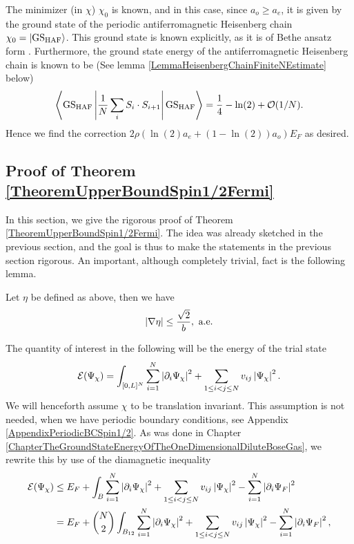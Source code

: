 The minimizer (in $ \chi $) $ \chi_0 $ is known, and in this case, since $ a_o\geq a_e $, it is given by the ground state of the periodic antiferromagnetic Heisenberg chain $ \chi_0=\ket{\text{GS}_{\text{HAF}}} $. This ground state is known explicitly, as it is of Bethe ansatz form \cite{bethe1931theorie}. Furthermore, the ground state energy of the antiferromagnetic Heisenberg chain is known to be \cite{hult1938,mattis2012theory} (See lemma \ref{LemmaHeisenbergChainFiniteNEstimate} below) \begin{equation}
\left\langle\text{GS}_{\text{HAF}} \left \lvert \frac{1}{N}\sum_{i}S_i\cdot S_{i+1} \right\rvert \text{GS}_{\text{HAF}}\right\rangle=\frac{1}{4}-\ln(2)+\mathcal{O}(1/N).
\end{equation}
Hence we find the correction $ 2\rho \left(\ln(2)a_e+(1-\ln(2))a_o\right)E_F $ as desired.
\subsection{Proof of Theorem \ref{TheoremUpperBoundSpin1/2Fermi}}
In this section, we give the rigorous proof of Theorem \ref{TheoremUpperBoundSpin1/2Fermi}. The idea was already sketched in the previous section, and the goal is thus to make the statements in the previous section rigorous. An important, although completely trivial, fact is the following lemma. \begin{lemma}\label{LemmaEtaDerivative}
	Let $ \eta $ be defined as above, then we have \begin{equation}
	\left\lvert \nabla\eta \right\rvert\leq \frac{\sqrt{2}}{b}, \textnormal{ a.e}.
	\end{equation}
\end{lemma}
The quantity of interest in the following will be the energy of the trial state\begin{equation}
\mathcal{E}(\Psi_\chi)=\int_{[0,L]^N}\sum_{i=1}^{N} \left\lvert \partial_i\Psi_\chi \right\rvert^2+\sum_{1\leq i<j\leq N}v_{ij}\left\lvert \Psi_\chi \right\rvert^2.
\end{equation}
We will henceforth assume $ \chi $ to be translation invariant. This assumption is not needed, when we have periodic boundary conditions, see Appendix \ref{AppendixPeriodicBCSpin1/2}.
As was done in Chapter \ref{ChapterTheGroundStateEnergyOfTheOneDimensionalDiluteBoseGas}, we rewrite this by use of the diamagnetic inequality\begin{equation}\label{EqEnergy1Spin1/2}
\begin{aligned}
\mathcal{E}(\Psi_\chi)&\leq E_F + \int_{B}\sum_{i=1}^{N}\left\lvert \partial_i\Psi_{\chi} \right\rvert^2+\sum_{1\leq i<j\leq N}v_{ij}\left\lvert \Psi_{\chi} \right\rvert^2-\sum_{i=1}^{N}\left\lvert \partial_i \Psi_F \right\rvert^2\\
&=E_F+\binom{N}{2}\int_{B_{12}}\sum_{i=1}^{N}\left\lvert \partial_i\Psi_{\chi} \right\rvert^2+\sum_{1\leq i<j\leq N}v_{ij}\left\lvert \Psi_{\chi} \right\rvert^2-\sum_{i=1}^{N}\left\lvert \partial_i \Psi_F \right\rvert^2,
\end{aligned}
\end{equation}
